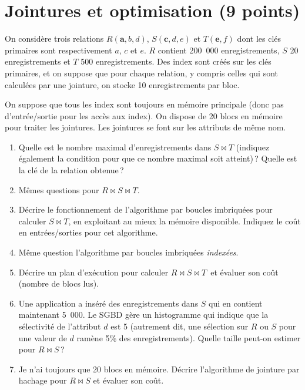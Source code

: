 \section{Jointures et optimisation (9 points)}

On considère trois relations 
$R(\textbf{a},b,d)$, $S(\textbf{c},d,e)$ et $T(\textbf{e},f)$ dont les clés
primaires sont respectivement $a$, $c$ et $e$.
$R$ contient 200~000 enregistrements, $S$  20 enregistrements et $T$ 500 enregistrements. Des index
sont créés sur les clés primaires, et on suppose que
pour chaque relation, y compris celles qui sont calculées par une jointure,
on stocke 10 enregistrements par bloc.

On suppose que tous les index sont toujours en mémoire principale
(donc pas d'entrée/sortie pour les accès aux index).
On dispose de 20 blocs en mémoire pour traiter les jointures.
Les jointures se font sur les attributs de même nom.

\begin{enumerate}
  \item Quelle est le nombre maximal
    d'enregistrements dans $S \Join T$ (indiquez également la condition 
     pour que ce nombre maximal soit atteint)\,? Quelle est la clé de la
    relation obtenue\,?

  \item Mêmes questions pour $R \Join S \Join T$.

  \item Décrire le fonctionnement de l'algorithme par boucles 
   imbriquées pour calculer $S \Join T$, en exploitant au mieux la
   mémoire disponible. 
   Indiquez le coût en entrées/sorties pour cet algorithme.

  \item Même question l'algorithme par boucles 
   imbriquées \emph{indexées}.
   
  \item Décrire un plan d'exécution  
    pour calculer $R \Join S \Join T$\ et 
    évaluer son coût (nombre de blocs lus).
    
    \item  Une application a inséré des enregistrements dans $S$
qui en contient maintenant 5~000. Le
SGBD gère un histogramme qui indique que la sélectivité
de l'attribut $d$ est 5 (autrement dit, une sélection 
sur $R$ ou $S$ pour une valeur de $d$ ramène 5\% des enregistrements).
Quelle taille peut-on estimer pour $R \Join S$\,?

  \item Je n'ai toujours que 20 blocs en mémoire.
  Décrire l'algorithme de jointure par hachage pour $R \Join S$ 
  et évaluer son coût.
\end{enumerate}

